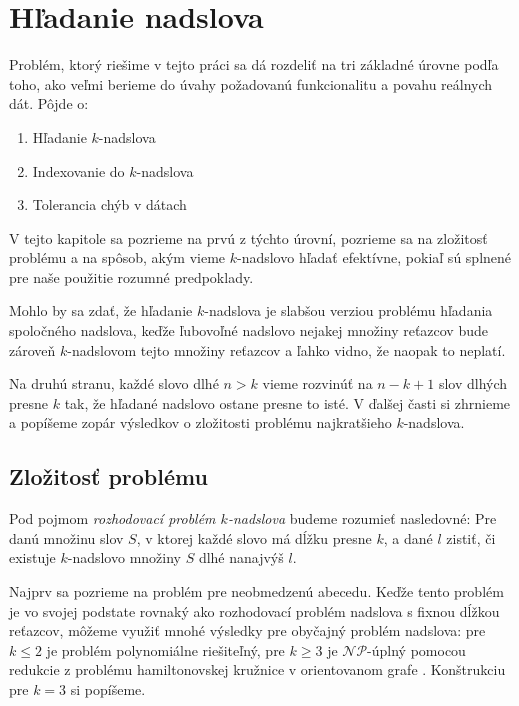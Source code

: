 \chapter{Hľadanie nadslova}

Problém, ktorý riešime v tejto práci sa dá rozdeliť na tri základné úrovne podľa toho,
ako veľmi berieme do úvahy požadovanú funkcionalitu a povahu reálnych dát. Pôjde o:
\begin{enumerate}
    \item Hľadanie $k$-nadslova
    \item Indexovanie do $k$-nadslova
    \item Tolerancia chýb v dátach
\end{enumerate}
V tejto kapitole sa pozrieme na prvú z týchto úrovní, pozrieme sa na zložitosť problému
a na spôsob, akým vieme $k$-nadslovo hľadať efektívne, pokiaľ sú splnené pre naše
použitie rozumné predpoklady.

Mohlo by sa zdať, že hľadanie $k$-nadslova je slabšou verziou problému hľadania
spoločného nadslova, keďže ľubovoľné nadslovo nejakej množiny reťazcov bude zároveň
$k$-nadslovom tejto množiny reťazcov a ľahko vidno, že naopak to neplatí.

Na druhú stranu, každé slovo dlhé $n > k$ vieme rozvinúť na $n - k + 1$ slov dlhých
presne $k$ tak, že hľadané nadslovo ostane presne to isté. V ďalšej časti si zhrnieme
a popíšeme zopár výsledkov o zložitosti problému najkratšieho $k$-nadslova.


\section{Zložitosť problému}

\begin{defn}
Pod pojmom \emph{rozhodovací problém $k$-nadslova} budeme rozumieť nasledovné:
Pre danú množinu slov $S$, v ktorej každé slovo má dĺžku presne $k$,
a dané $l$ zistiť, či existuje $k$-nadslovo množiny $S$ dlhé nanajvýš $l$.
\end{defn}

Najprv sa pozrieme na problém pre neobmedzenú abecedu. Keďže tento problém je
vo svojej podstate rovnaký ako rozhodovací problém nadslova s fixnou dĺžkou reťazcov, môžeme využiť mnohé výsledky
pre obyčajný problém nadslova: pre $k \leq 2$ je problém polynomiálne riešiteľný,
pre $k \ge 3$ je $\mathcal{NP}$-úplný pomocou redukcie z problému hamiltonovskej
kružnice v orientovanom grafe \cite{superstring}. Konštrukciu pre $k = 3$ si popíšeme.

